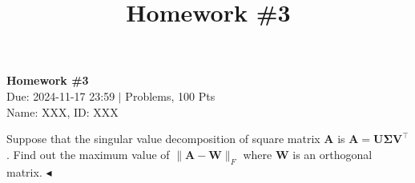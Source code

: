 \documentclass[11pt]{article}
\title{Homework \#3}
\newenvironment{problem}[2][Problem]{\begin{trivlist}
\item[\hskip \labelsep {\bfseries #1}\hskip \labelsep {\bfseries #2.}]}{\hfill$\blacktriangleleft$\end{trivlist}}
\begin{document}
\pagestyle{fancy}
\chead{}

\begin{center}
    {\LARGE \bf Homework \#3}\\
    {Due: 2024-11-17 23:59 \quad$|$ Problems, 100 Pts}\\
    {Name: XXX, ID: XXX}            %
\end{center}



\begin{problem}{1 (10')}
Suppose that the singular value decomposition of square matrix $\bm A$ is $\bm A = \bm U \bm \Sigma \bm V^\top$. Find out the maximum value of $\|\bm A - \bm W\|_F$ where $\bm W$ is an orthogonal matrix.
\end{problem}
\end{document}
